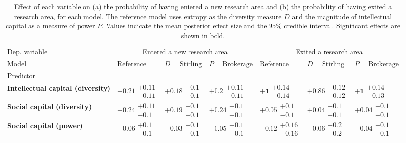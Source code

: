 \begin{table}[H]
\caption{Effect of each variable on (a) the probability of having entered a new research area and (b) the probability of having exited a research area, for each model. The reference model uses entropy as the diversity measure $D$ and the magnitude of intellectual capital as a measure of power $P$. Values indicate the mean posterior effect size and the 95\% credible interval. Significant effects are shown in bold.}
\label{table:summary_entered_exited}
\renewcommand{\arraystretch}{2}\fontsize{6}{7}\selectfont\begin{tabular}{lllllll}
\toprule
Dep. variable & \multicolumn{3}{c}{Entered a new research area} & \multicolumn{3}{c}{Exited a research area} \\
Model & Reference & $D=\text{Stirling}$ & $P=\text{Brokerage}$ & Reference & $D=\text{Stirling}$ & $P=\text{Brokerage}$ \\
Predictor &  &  &  &  &  &  \\
\midrule
\textbf{Intellectual capital (diversity)} & $\bm{+0.21}\substack{+0.11 \\ -0.11}$ & $\bm{+0.18}\substack{+0.1 \\ -0.1}$ & $\bm{+0.2}\substack{+0.11 \\ -0.11}$ & $\bm{+1}\substack{+0.14 \\ -0.14}$ & $\bm{+0.86}\substack{+0.12 \\ -0.12}$ & $\bm{+1}\substack{+0.14 \\ -0.13}$ \\
\textbf{Social capital (diversity)} & $\bm{+0.24}\substack{+0.11 \\ -0.1}$ & $\bm{+0.19}\substack{+0.1 \\ -0.1}$ & $\bm{+0.24}\substack{+0.1 \\ -0.1}$ & $+0.05\substack{+0.1 \\ -0.1}$ & $+0.04\substack{+0.1 \\ -0.1}$ & $+0.04\substack{+0.1 \\ -0.1}$ \\
\textbf{Social capital (power)} & $-0.06\substack{+0.1 \\ -0.1}$ & $-0.03\substack{+0.1 \\ -0.1}$ & $-0.05\substack{+0.1 \\ -0.1}$ & $-0.12\substack{+0.16 \\ -0.16}$ & $-0.06\substack{+0.2 \\ -0.2}$ & $-0.04\substack{+0.1 \\ -0.1}$ \\

\end{tabular}
\end{table}
